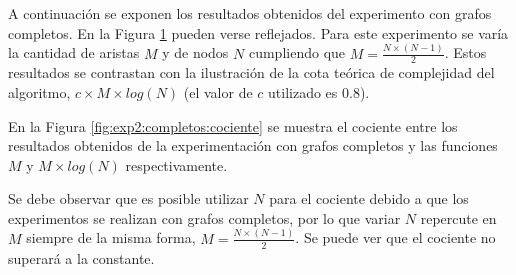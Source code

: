     \renewcommand\constante{0.8}

    A continuación se exponen los resultados obtenidos del experimento con grafos completos. En la Figura \ref{fig:exp2:completos} pueden verse reflejados. Para este experimento se varía la cantidad de aristas $M$ y de nodos $N$ cumpliendo que $M = \frac{N \times (N - 1)}{2}$. Estos resultados se contrastan con la ilustración de la cota teórica de complejidad del algoritmo, $c \times M \times log(N)$ (el valor de $c$ utilizado es \constante).

    \begin{figure}[H]
        \centering
        \caption{}
        \label{fig:exp2:completos}
    \end{figure}

    En la Figura \ref{fig:exp2:completos:cociente} se muestra el cociente entre los resultados obtenidos de la experimentación con grafos completos y las funciones $M$ y $M \times log(N)$ respectivamente.

    Se debe observar que es posible utilizar $N$ para el cociente debido a que los experimentos se realizan con grafos completos, por lo que variar $N$ repercute en $M$ siempre de la misma forma, $M = \frac{N \times (N - 1)}{2}$. Se puede ver que el cociente no superará a la constante.

